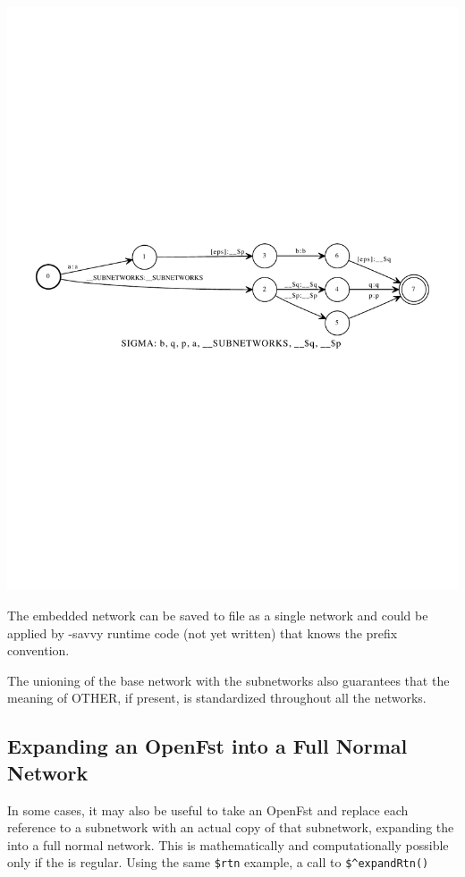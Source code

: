 \begin{center}
\includegraphics[width=\textwidth]{images/embedded.pdf}
\end{center}

\noindent
The embedded network can be saved to file as a single network and could be
applied by -savvy runtime code (not yet written) that knows the prefix convention.

The unioning of the base network with the subnetworks also guarantees that
the meaning of OTHER, if present, is standardized throughout all the
networks.

\subsection{Expanding an OpenFst  into a Full Normal Network}

In some cases, it may also be useful to take an OpenFst  and replace
each reference to a subnetwork with an actual copy of that subnetwork,
expanding the  into a full normal network.  This is mathematically and
computationally possible only if the  is regular.  Using the same
\verb!$rtn! example, a call to \verb!$^expandRtn()!

